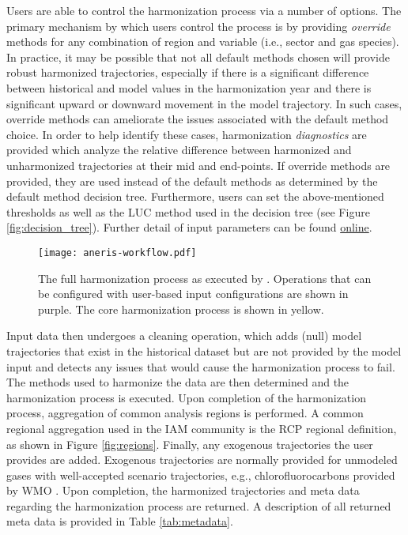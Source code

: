 Users are able to control the harmonization process via a number of options. The
primary mechanism by which users control the process is by providing
\textit{override} methods for any combination of region and variable (i.e.,
sector and gas species).  In practice, it may be possible that not all default
methods chosen will provide robust harmonized trajectories, especially if there
is a significant difference between historical and model values in the
harmonization year and there is significant upward or downward movement in the
model trajectory. In such cases, override methods can ameliorate the issues
associated with the default method choice. In order to help identify these
cases, harmonization \textit{diagnostics} are provided which analyze the relative
difference between harmonized and unharmonized trajectories at their mid and
end-points. If override methods are provided, they are used instead of the
default methods as determined by the default method decision tree. Furthermore,
users can set the above-mentioned thresholds as well as the LUC method used in
the decision tree (see Figure \ref{fig:decision_tree}). Further detail of input
parameters can be found \href{http://mattgidden.com/aneris/config.html}{online}.

\begin{figure}
  \begin{center}
    \texttt{[image: aneris-workflow.pdf]}
    \caption[]{
      \label{fig:workflow}
      The full harmonization process as executed by . Operations
      that can be configured with user-based input configurations are shown in
      purple. The core harmonization process is shown in yellow.  }
  \end{center}
\end{figure}

Input data then undergoes a cleaning operation, which adds (null) model
trajectories that exist in the historical dataset but are not provided by the
model input and detects any issues that would cause the harmonization process to
fail. The methods used to harmonize the data are then determined and the
harmonization process is executed. Upon completion of the harmonization process,
aggregation of common analysis regions is performed. A common regional
aggregation used in the IAM community is the RCP regional definition, as shown
in Figure \ref{fig:regions}. Finally, any exogenous trajectories the user provides
are added. Exogenous trajectories are normally provided for unmodeled gases with
well-accepted scenario trajectories, e.g., chlorofluorocarbons provided by WMO
\cite{wmo2014}. Upon completion, the harmonized trajectories and meta data
regarding the harmonization process are returned. A description of all returned
meta data is provided in Table \ref{tab:metadata}.


